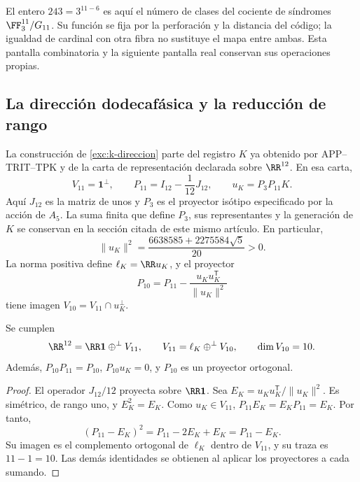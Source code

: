 El entero \(243=3^{11-6}\) es aquí el número de clases
del cociente de síndromes \(\FF_3^{11}/G_{11}\). Su
función se fija por la perforación y la distancia del
código; la igualdad de cardinal con otra fibra no sustituye
el mapa entre ambas. Esta pantalla combinatoria y la
siguiente pantalla real conservan sus operaciones propias.

\subsection{La dirección dodecafásica y la reducción de rango}

La construcción de \ref{exc:k-direccion} parte del registro
\(K\) ya obtenido por APP--TRIT--TPK y de la carta de
representación declarada sobre \(\RR^{12}\). En esa carta,
\begin{equation}
 V_{11}=\mathbf1^\perp,\qquad
 P_{11}=I_{12}-\frac1{12}J_{12},\qquad
 u_K=P_3P_{11}K.
 \label{iv:eq:p11-uk}
\end{equation}
Aquí \(J_{12}\) es la matriz de unos y \(P_3\) es el
proyector isótipo especificado por la acción de \(A_5\).
La suma finita que define \(P_3\), sus representantes y la
generación de \(K\) se conservan en la sección citada de
este mismo artículo. En particular,
\[
 \|u_K\|^2=\frac{6638585+2275584\sqrt5}{20}>0.
\]
La norma positiva define \(\ell_K=\RR u_K\), y el
proyector
\begin{equation}
 P_{10}=P_{11}-\frac{u_Ku_K^{\mathsf T}}{\|u_K\|^2}
 \label{iv:eq:p10}
\end{equation}
tiene imagen \(V_{10}=V_{11}\cap u_K^\perp\).

\begin{proposition}
\label{iv:prop:12-11-10}
Se cumplen
\[
 \RR^{12}=\RR\mathbf1\mathbin{\oplus^\perp}V_{11},\qquad
 V_{11}=\ell_K\mathbin{\oplus^\perp}V_{10},\qquad
 \dim V_{10}=10.
\]
Además, \(P_{10}P_{11}=P_{10}\), \(P_{10}u_K=0\), y
\(P_{10}\) es un proyector ortogonal.
\end{proposition}
\begin{proof}
El operador \(J_{12}/12\) proyecta sobre \(\RR\mathbf1\).
Sea \(E_K=u_Ku_K^{\mathsf T}/\|u_K\|^2\). Es simétrico,
de rango uno, y \(E_K^2=E_K\). Como \(u_K\in V_{11}\),
\(P_{11}E_K=E_KP_{11}=E_K\). Por tanto,
\[
 (P_{11}-E_K)^2=P_{11}-2E_K+E_K=P_{11}-E_K.
\]
Su imagen es el complemento ortogonal de \(\ell_K\) dentro
de \(V_{11}\), y su traza es \(11-1=10\). Las demás
identidades se obtienen al aplicar los proyectores a cada
sumando.
\end{proof}

